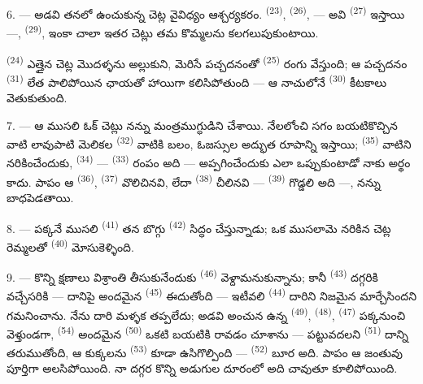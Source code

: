 6. --- అడవి తనలో ఉంచుకున్న చెట్ల వైవిధ్యం ఆశ్చర్యకరం. 
\textsuperscript{(23)},  \textsuperscript{(26)},  —
అవి  \textsuperscript{(27)} ఇస్తాయి —, 
\textsuperscript{(29)}, ఇంకా చాలా ఇతర చెట్లు తమ కొమ్మలను కలగలుపుకుంటాయి.

 \textsuperscript{(24)} ఎత్తైన చెట్ల మొదళ్ళను అల్లుకుని, మెరిసే పచ్చదనంతో
 \textsuperscript{(25)} రంగు వేస్తుంది; ఆ పచ్చదనం
 \textsuperscript{(31)} లేత పాలిపోయిన ఛాయతో హాయిగా కలిసిపోతుంది — ఆ నాచులోనే
 \textsuperscript{(30)} కీటకాలు వెతుకుతుంది.

\VUsaut{5.0mm}
\VUsaut{3.4mm}

7. --- ఆ ముసలి ఓక్ చెట్లు నన్ను మంత్రముగ్ధుడిని చేశాయి. నేలలోంచి సగం బయటికొచ్చిన వాటి
లావుపాటి మెలికల  \textsuperscript{(32)} వాటికి బలం, ఓజస్సుల అద్భుత రూపాన్ని
ఇస్తాయి;  \textsuperscript{(35)} వాటిని నరికించేందుకు, 
\textsuperscript{(34)} —  \textsuperscript{(33)} రంపం అది —
అప్పగించేందుకు ఎలా ఒప్పుకుంటాడో నాకు అర్థం కాదు. పాపం ఆ 
\textsuperscript{(36)},  \textsuperscript{(37)} వొలిచినవి, లేదా
 \textsuperscript{(38)} చీలినవి —  \textsuperscript{(39)}
గొడ్డలి అది —, నన్ను బాధపెడతాయి.

8. --- పక్కనే ముసలి  \textsuperscript{(41)} తన 
బొగ్గు  \textsuperscript{(42)} సిద్ధం చేస్తున్నాడు; ఒక ముసలామె నరికిన చెట్ల
రెమ్మలతో   \textsuperscript{(40)} మోసుకెళ్ళింది.

\VUsaut{5.0mm}
\VUsaut{3.4mm}

9. --- కొన్ని క్షణాలు విశ్రాంతి తీసుకునేందుకు 
\textsuperscript{(46)} వెళ్దామనుకున్నాను; కానీ  \textsuperscript{(43)}
దగ్గరికి వచ్చేసరికి — దానిపై అందమైన  \textsuperscript{(45)} ఈదుతోంది — ఇటీవలి
 \textsuperscript{(44)} దారిని నిజమైన  మార్చేసిందని గమనించాను.
నేను దారి మళ్ళక తప్పలేదు; అడవి అంచున ఉన్న  \textsuperscript{(49)},
 \textsuperscript{(48)},  \textsuperscript{(47)}
పక్కనుంచి వెళ్తుండగా,  \textsuperscript{(54)} అందమైన
 \textsuperscript{(50)} ఒకటి బయటికి రావడం చూశాను — పట్టువదలని
 \textsuperscript{(51)} దాన్ని తరుముతోంది, ఆ కుక్కలను
 \textsuperscript{(53)} కూడా ఉసిగొల్పింది —
 \textsuperscript{(52)} బూర అది. పాపం ఆ జంతువు పూర్తిగా
అలసిపోయింది. నా దగ్గర కొన్ని అడుగుల దూరంలో అది చావుతూ కూలిపోయింది.

